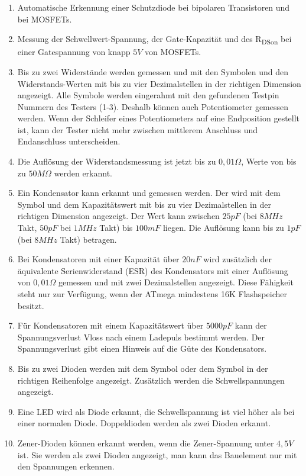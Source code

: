 \begin{enumerate}
\item Automatische Erkennung einer Schutzdiode bei bipolaren Transistoren und bei MOSFETs.
\item Messung der Schwellwert-Spannung, der Gate-Kapazität  und des R\textsubscript{DSon} bei einer Gatespannung von knapp \(5V\) von MOSFETs.
\item Bis zu zwei Widerstände werden gemessen und mit den \mbox{\electricR} Symbolen
und den Widerstands-Werten mit bis zu vier Dezimalstellen in der richtigen Dimension angezeigt.
Alle Symbole werden eingerahmt mit den gefundenen Testpin Nummern des Testers (1-3).
Deshalb können auch Potentiometer gemessen werden. Wenn der Schleifer eines Potentiometers auf eine Endposition
gestellt ist, kann der Tester nicht mehr zwischen mittlerem Anschluss und Endanschluss unterscheiden.
\item Die Auflösung der Widerstandsmessung ist jetzt bis zu \(0,01\Omega\), Werte von bis zu \(50M\Omega\) werden erkannt.
\item Ein Kondensator kann erkannt und gemessen werden. Der wird mit dem Symbol \mbox{\electricC}
und dem Kapazitätswert mit bis zu vier Dezimalstellen in der richtigen Dimension angezeigt.
Der Wert kann zwischen \(25pF\) (bei \(8MHz\) Takt, \(50pF\) bei \(1MHz\) Takt) bis \(100mF\) liegen. Die Auflösung kann bis zu \(1pF\) (bei \(8MHz\) Takt) betragen.
\item Bei Kondensatoren mit einer Kapazität über \(20nF\) wird zusätzlich der äquivalente Serienwiderstand (ESR) des Kondensators
mit einer Auflösung von \(0,01\Omega\) gemessen und mit zwei Dezimalstellen angezeigt.
Diese Fähigkeit steht nur zur Verfügung, wenn der ATmega mindestens 16K Flashspeicher besitzt.
\item Für Kondensatoren mit einem Kapazitätswert über \(5000pF\) kann der Spannungsverlust Vloss nach einem Ladepuls bestimmt werden.
Der Spannungsverlust gibt einen Hinweis auf die Güte des Kondensators.
\item Bis zu zwei Dioden werden mit dem Symbol \mbox{\electricDAK} oder dem Symbol \mbox{\electricDKA}
in der richtigen Reihenfolge angezeigt.
Zusätzlich werden die Schwellspannungen angezeigt.
\item Eine LED wird als Diode erkannt, die Schwellspannung ist viel höher als bei einer normalen Diode.
Doppeldioden werden als zwei Dioden erkannt.
\item Zener-Dioden können erkannt werden, wenn die Zener-Spannung unter \(4,5V\) ist.
Sie werden als zwei Dioden angezeigt, man kann das Bauelement nur mit den Spannungen erkennen.

\end{enumerate}
